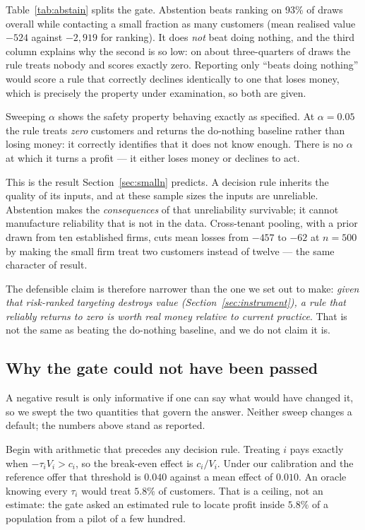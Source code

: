 \documentclass[11pt,a4paper]{article}
\newcommand{\CATE}{\tau}
\begin{document}
Table~\ref{tab:abstain} splits the gate. Abstention beats ranking on 93\% of draws
overall while contacting a small fraction as many customers (mean realised value
$-524$ against $-2{,}919$ for ranking). It does \emph{not} beat doing nothing, and the
third column explains why the second is so low: on about three-quarters of draws the
rule treats nobody and scores exactly zero. Reporting only ``beats doing nothing''
would score a rule that correctly declines identically to one that loses money, which
is precisely the property under examination, so both are given.

Sweeping $\alpha$ shows the safety property behaving exactly as specified. At
$\alpha = 0.05$ the rule treats \emph{zero} customers and returns the do-nothing
baseline rather than losing money: it correctly identifies that it does not know
enough. There is no $\alpha$ at which it turns a profit --- it either loses money or
declines to act.

This is the result Section~\ref{sec:smalln} predicts. A decision rule inherits the
quality of its inputs, and at these sample sizes the inputs are unreliable. Abstention
makes the \emph{consequences} of that unreliability survivable; it cannot manufacture
reliability that is not in the data. Cross-tenant pooling, with a prior drawn from ten
established firms, cuts mean losses from $-457$ to $-62$ at $n = 500$ by making the
small firm treat two customers instead of twelve --- the same character of result.

The defensible claim is therefore narrower than the one we set out to make: \emph{given
that risk-ranked targeting destroys value (Section~\ref{sec:instrument}), a rule that
reliably returns to zero is worth real money relative to current practice}. That is not
the same as beating the do-nothing baseline, and we do not claim it is.

\subsection{Why the gate could not have been passed}
\label{sec:sensitivity}

A negative result is only informative if one can say what would have changed it, so we
swept the two quantities that govern the answer. Neither sweep changes a default; the
numbers above stand as reported.

Begin with arithmetic that precedes any decision rule. Treating $i$ pays exactly when
$-\CATE_i V_i > c_i$, so the break-even effect is $c_i / V_i$. Under our calibration and
the reference offer that threshold is $0.040$ against a mean effect of $0.010$. An oracle
knowing every $\CATE_i$ would treat $5.8\%$ of customers. That is a ceiling, not an
estimate: the gate asked an estimated rule to locate profit inside $5.8\%$ of a
population from a pilot of a few hundred.
\end{document}
